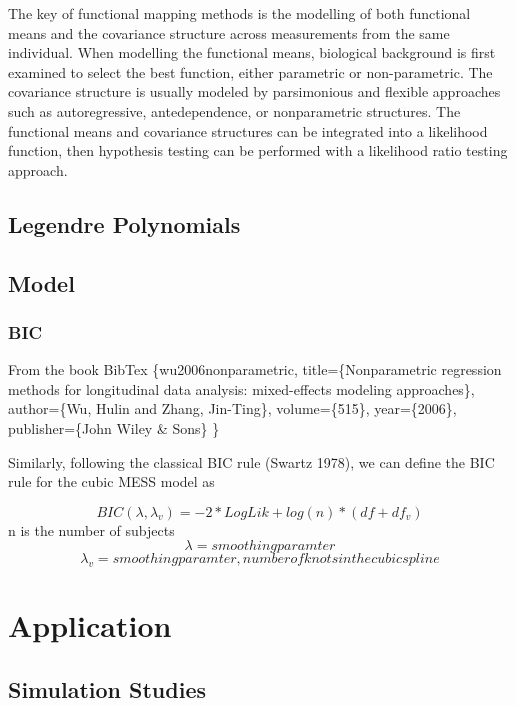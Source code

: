 \documentclass[]{book}
\theoremstyle{definition}
\theoremstyle{definition}
\theoremstyle{remark}
\begin{document}
The key of functional mapping methods is the modelling of both
functional means and the covariance structure across measurements from
the same individual. When modelling the functional means, biological
background is first examined to select the best function, either
parametric or non-parametric. The covariance structure is usually
modeled by parsimonious and flexible approaches such as autoregressive,
antedependence, or nonparametric structures. The functional means and
covariance structures can be integrated into a likelihood function, then
hypothesis testing can be performed with a likelihood ratio testing
approach.

\subsection{Legendre Polynomials}\label{legendre-polynomials}

\subsection{Model}\label{model}

\subsubsection{BIC}\label{bic}

From the book BibTex \citet{book}\{wu2006nonparametric,
title=\{Nonparametric regression methods for longitudinal data analysis:
mixed-effects modeling approaches\}, author=\{Wu, Hulin and Zhang,
Jin-Ting\}, volume=\{515\}, year=\{2006\}, publisher=\{John Wiley \&
Sons\} \}

Similarly, following the classical BIC rule (Swartz 1978), we can define
the BIC rule for the cubic MESS model as

\[BIC(\lambda, \lambda_v ) = -2*LogLik + log(n)*(df + df_v)\] n is the
number of subjects \[\lambda = smoothing paramter\]
\[\lambda_v = smoothing paramter, number of knots in the cubic spline\]

\section{Application}\label{application-1}

\subsection{Simulation Studies}\label{simulation-studies}
\end{document}
